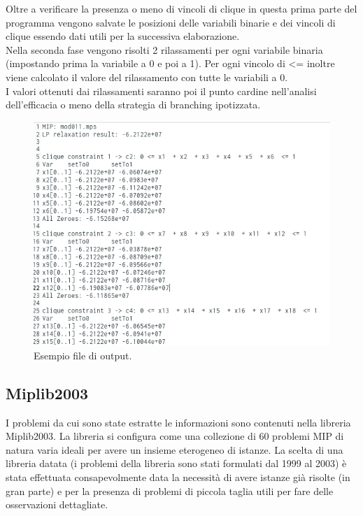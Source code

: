 \documentclass[12pt,a4paper,twoside,openright]{book}
\begin{document}
Oltre a verificare la presenza o meno di vincoli di clique in questa prima parte del programma
vengono salvate le posizioni delle variabili binarie e dei vincoli di clique essendo dati 
utili per la successiva elaborazione.\\ Nella seconda fase vengono risolti 2 rilassamenti 
per ogni variabile binaria (impostando prima la variabile a 0 e poi a 1). Per ogni vincolo 
di <= inoltre viene calcolato il valore del rilassamento con tutte le variabili a 0.\\I valori 
ottenuti dai rilassamenti saranno poi il punto cardine nell'analisi dell'efficacia o meno
della strategia di branching ipotizzata. \\
\begin{figure}[ht]
    \centering
    \includegraphics [scale = 0.5]{output_example.png}
    \caption{Esempio file di output.}
    \label{fig:output}
\end{figure}

\subsection{Miplib2003}
I problemi da cui sono state estratte le informazioni sono contenuti nella libreria Miplib2003.
La libreria si configura come una collezione di 60 problemi MIP di natura varia ideali per avere
un insieme eterogeneo di istanze. La scelta di una libreria datata (i problemi della libreria 
sono stati formulati dal 1999 al 2003) è stata effettuata consapevolmente data la necessità di avere 
istanze già risolte (in gran parte) e per la presenza di problemi di piccola taglia utili per fare 
delle osservazioni dettagliate.
\end{document}
